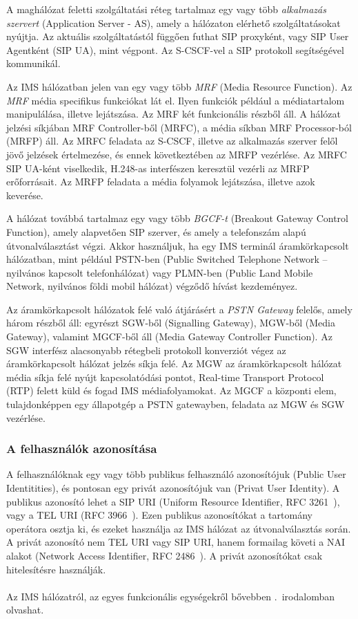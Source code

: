 A maghálózat feletti szolgáltatási réteg tartalmaz egy vagy több \emph{alkalmazás szervert} (Application Server - AS), amely a hálózaton elérhető szolgáltatásokat nyújtja. Az aktuális szolgáltatástól függően futhat SIP proxyként, vagy SIP User Agentként (SIP UA), mint végpont. Az S-CSCF-vel a SIP protokoll segítségével kommunikál.

Az IMS hálózatban jelen van egy vagy több \emph{MRF} (Media Resource Function). Az \emph{MRF} média specifikus funkciókat lát el. Ilyen funkciók például a médiatartalom manipulálása, illetve lejátszása. Az MRF két funkcionális részből áll. A hálózat jelzési síkjában MRF Controller-ből (MRFC), a média síkban MRF Processor-ból (MRFP) áll.  Az MRFC feladata az S-CSCF, illetve az alkalmazás szerver felől jövő jelzések értelmezése, és ennek következtében az MRFP vezérlése. Az MRFC SIP UA-ként viselkedik, H.248-as interfészen keresztül vezérli az MRFP erőforrásait. Az MRFP feladata a média folyamok lejátszása, illetve azok keverése. 

A hálózat továbbá tartalmaz egy vagy több \emph{BGCF-t} (Breakout Gateway Control Function), amely alapvetően SIP szerver, és amely a telefonszám alapú útvonalválasztást végzi. Akkor használjuk, ha egy IMS terminál áramkörkapcsolt hálózatban, mint például PSTN-ben (Public Switched Telephone Network – nyilvános kapcsolt telefonhálózat) vagy PLMN-ben (Public Land Mobile Network, nyilvános földi mobil hálózat) végződő hívást kezdeményez.

Az áramkörkapcsolt hálózatok felé való átjárásért a \emph{PSTN Gateway} felelős, a\-mely három részből áll: egyrészt SGW-ből (Signalling Gateway), MGW-ből (Media Gateway), valamint MGCF-ből áll (Media Gateway Controller Function). Az SGW interfész alacsonyabb rétegbeli protokoll konverziót végez az áramkörkapcsolt hálózat jelzés síkja felé. Az MGW az áramkörkapcsolt hálózat média síkja felé nyújt kapcsolatódási pontot, Real-time Transport Protocol (RTP) felett küld és fogad IMS médiafolyamokat. Az MGCF a központi elem, tulajdonképpen egy állapotgép a PSTN gatewayben, feladata az MGW és SGW vezérlése.

\subsubsection{A felhasználók azonosítása}

A felhasználóknak egy vagy több publikus felhasználó azonosítójuk (Public User Identitities), és pontosan egy privát azonosítójuk van (Privat User Identity). A publikus azonosító lehet a SIP URI (Uniform Resource Identifier, RFC 3261~\cite{rfc3261}), vagy a TEL URI (RFC 3966~\cite{rfc3966}). Ezen publikus azonosítókat a tartomány operátora osztja ki, és ezeket használja az IMS hálózat az útvonalválasztás során. A privát azonosító nem TEL URI vagy SIP URI, hanem formailag követi a NAI alakot (Network Access Identifier, RFC 2486~\cite{rfc2486}). A privát azonosítókat csak hitelesítésre használják.
\\
\\
Az IMS hálózatról, az egyes funkcionális egységekről bővebben .~irodalomban olvashat.

